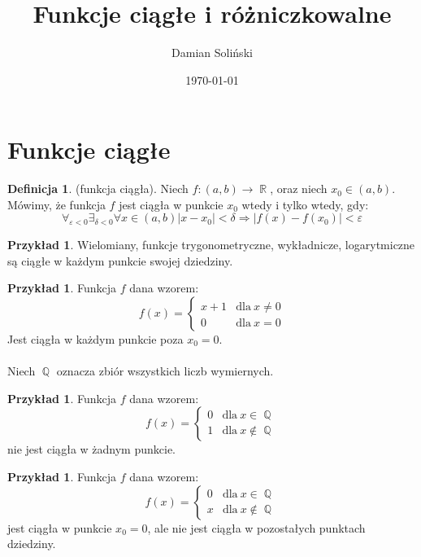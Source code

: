 \documentclass[12pt,a4paper]{article}
\title{Funkcje ciągłe i różniczkowalne}
\date{\today}
\author{Damian Soliński}
\theoremstyle{definition}
\newtheorem{df}[tw]{Definicja}
\newtheorem{ex}[tw]{Przykład}
\DeclareMathOperator{\R}{\mathbb{R}}
\DeclareMathOperator{\Q}{\mathbb{Q}}
\begin{document}
 
\maketitle

\tableofcontents

\section{Funkcje ciągłe}

\begin{df}
(funkcja ciągła). Niech $f:(a,b)\to\R$, oraz niech $x_0\in(a,b)$. Mówimy, że funkcja $f$ jest ciągła w punkcie $x_0$ wtedy i tylko wtedy, gdy:
\[\forall_{\varepsilon<0}\exists_{\delta<0}\forall x\in(a,b)|x-x_0|<\delta\Rightarrow|f(x)-f(x_0)|<\varepsilon\]
\end{df}

\begin{ex}
Wielomiany, funkcje trygonometryczne, wykładnicze, logarytmiczne są ciągłe w każdym punkcie swojej dziedziny.
\end{ex}

\begin{ex}
Funkcja $f$ dana wzorem:
\[f(x)=\left\{\begin{array}{ll}x+1&\mbox{dla}\ x\neq0\\0&\mbox{dla}\ x=0\end{array}\right.\]
Jest ciągła w każdym punkcie poza $x_0 = 0$.
\\\\ Niech $\Q$ oznacza zbiór wszystkich liczb wymiernych.
\end{ex}

\begin{ex}
Funkcja $f$ dana wzorem:
\[f(x)=\left\{\begin{array}{ll}0&\mbox{dla}\ x\in\Q\\1&\mbox{dla}\ x\not\in\Q\end{array}\right.\]
nie jest ciągła w żadnym punkcie.
\end{ex}

\begin{ex}
Funkcja $f$ dana wzorem:
\[f(x)=\left\{\begin{array}{ll}0&\mbox{dla}\ x\in\Q\\x&\mbox{dla}\ x\not\in\Q\end{array}\right.\]
jest ciągła w punkcie $x_0=0$, ale nie jest ciągła w pozostałych punktach dziedziny.
\end{ex}
\end{document}
